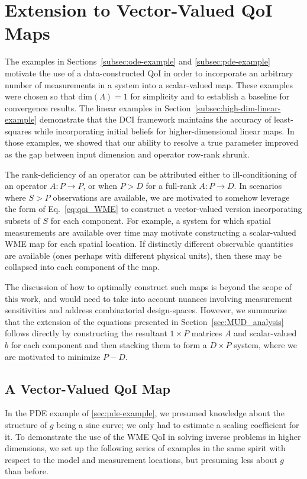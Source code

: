 \section{Extension to Vector-Valued QoI Maps}
The examples in Sections~\ref{subsec:ode-example} and \ref{subsec:pde-example} motivate the use of a data-constructed QoI in order to incorporate an arbitrary number of measurements in a system into a scalar-valued map.
These examples were chosen so that $\text{dim}({\Lambda}) = 1$ for simplicity and to establish a baseline for convergence results.
The linear examples in Section~\ref{subsec:high-dim-linear-example} demonstrate that the DCI framework maintains the accuracy of least-squares while incorporating initial beliefs for higher-dimensional linear maps.
In those examples, we showed that our ability to resolve a true parameter improved as the gap between input dimension and operator row-rank shrunk.

The rank-deficiency of an operator can be attributed either to ill-conditioning of an operator $A:P\to P$, or when $P>D$ for a full-rank $A:P\to D$.
In scenarios where $S>P$ observations are available, we are motivated to somehow leverage the form of Eq.~\eqref{eq:qoi_WME} to construct a vector-valued version incorporating subsets of $S$ for each component.
For example, a system for which spatial measurements are available over time may motivate constructing a scalar-valued WME map for each spatial location.
If distinctly different observable quantities are available (ones perhaps with different physical units), then these may be collapsed into each component of the map.

The discussion of how to optimally construct such maps is beyond the scope of this work, and would need to take into account nuances involving measurement sensitivities and address combinatorial design-spaces.
However, we summarize that the extension of the equations presented in Section~\ref{sec:MUD_analysis} follows directly by constructing the resultant $1\times P$ matrices $A$ and scalar-valued $b$ for each component and then stacking them to form a $D\times P$ system, where we are motivated to minimize $P-D$.


\subsection{A Vector-Valued QoI Map}
In the PDE example of \ref{sec:pde-example}, we presumed knowledge about the structure of $g$ being a sine curve; we only had to estimate a scaling coefficient for it.
To demonstrate the use of the WME QoI in solving inverse problems in higher dimensions, we set up the following series of examples in the same spirit with respect to the model and measurement locations, but presuming less about $g$ than before.

